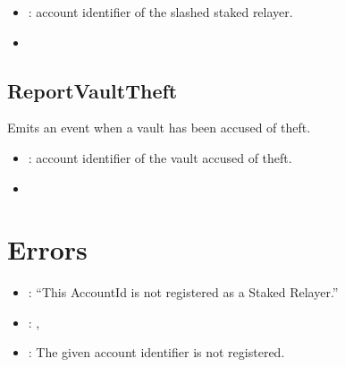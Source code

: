 \documentclass[a4paper,10pt,english]{sphinxmanual}
\begin{document}


\begin{itemize}
\item {} 
: account identifier of the slashed staked relayer.

\end{itemize}

\begin{itemize}
\item {} 
{\hyperref[\detokenize{spec/staked-relayers:slashstakedrelayer}]{}}

\end{itemize}


\subsection{ReportVaultTheft}
\label{\detokenize{spec/staked-relayers:id16}}
Emits an event when a vault has been accused of theft.



\begin{itemize}
\item {} 
: account identifier of the vault accused of theft.

\end{itemize}

\begin{itemize}
\item {} 
{\hyperref[\detokenize{spec/staked-relayers:reportvaulttheft}]{}}

\end{itemize}


\section{Errors}
\label{\detokenize{spec/staked-relayers:errors}}
\begin{itemize}
\item {} 
: “This AccountId is not registered as a Staked Relayer.”

\item {} 
: {\hyperref[\detokenize{spec/staked-relayers:deregisterstakedrelayer}]{}}, {\hyperref[\detokenize{spec/staked-relayers:slashstakedrelayer}]{}}

\item {} 
: The given account identifier is not registered.

\end{itemize}
\end{document}
